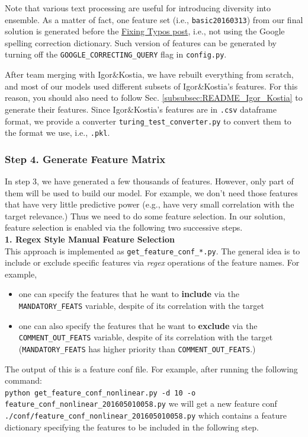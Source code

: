 \documentclass[12pt]{article}
\begin{document}
{{\begin{appendices}
Note that various text processing are useful for introducing diversity into ensemble. As a matter of fact, one feature set (i.e., \texttt{basic20160313}) from our final solution is generated before the \href{https://www.kaggle.com/steubk/home-depot-product-search-relevance/fixing-typos}{Fixing Typos post}, i.e., not using the Google spelling correction dictionary. Such version of features can be generated by turning off the \texttt{GOOGLE\_CORRECTING\_QUERY} flag in \texttt{config.py}.

After team merging with Igor\&Kostia, we have rebuilt everything from scratch, and most of our models used different subsets of Igor\&Kostia's features. For this reason, you should also need to follow Sec. \ref{subsubsec:README_Igor_Kostia} to generate their features. Since Igor\&Kostia's features are in \texttt{.csv} dataframe format, we provide a converter \texttt{turing\_test\_converter.py} to convert them to the format we use, i.e., \texttt{.pkl}.

\subsubsection{Step 4. Generate Feature Matrix}
In step 3, we have generated a few thousands of features. However, only part of them will be used to build our model. For example, we don't need those features that have very little predictive power (e.g., have very small correlation with the target relevance.) Thus we need to do some feature selection. In our solution, feature selection is enabled via the following two successive steps.\\
\textbf{1. Regex Style Manual Feature Selection}\\
This approach is implemented as \texttt{get\_feature\_conf\_*.py}. The general idea is to include or exclude specific features via \textit{regex} operations of the feature names. For example,
\begin{itemize}
\item one can specify the features that he want to \textbf{include} via the \texttt{MANDATORY\_FEATS} variable, despite of its correlation with the target
\item one can also specify the features that he want to \textbf{exclude} via the \texttt{COMMENT\_OUT\_FEATS} variable, despite of its correlation with the target (\texttt{MANDATORY\_FEATS} has higher priority than \texttt{COMMENT\_OUT\_FEATS}.)
\end{itemize}
The output of this is a feature conf file. For example, after running the following command:\\
\texttt{python get\_feature\_conf\_nonlinear.py -d 10 -o feature\_conf\_nonlinear\_201605010058.py}
we will get a new feature conf \texttt{./conf/feature\_conf\_nonlinear\_201605010058.py} which contains a feature dictionary specifying the features to be included in the following step.


\end{appendices}}}
\end{document}
